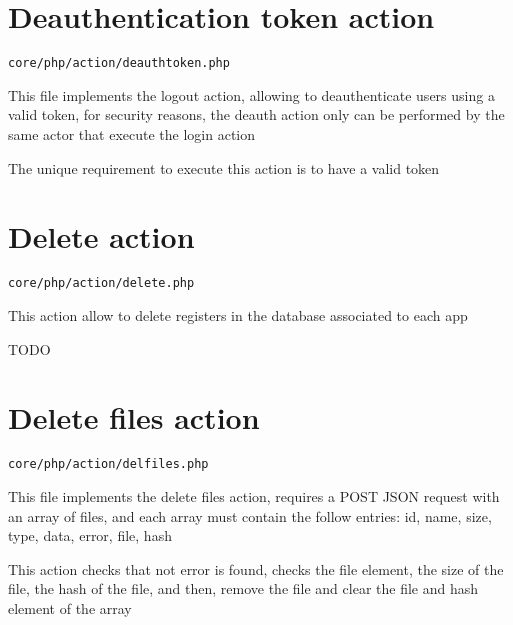 \documentclass[a4paper]{book}
\begin{document}
\hypertarget{toc10}{}
\section{Deauthentication token action}

\begin{lstlisting}
core/php/action/deauthtoken.php
\end{lstlisting}

This file implements the logout action, allowing to deauthenticate users
using a valid token, for security reasons, the deauth action only can
be performed by the same actor that execute the login action

The unique requirement to execute this action is to have a valid token

\hypertarget{toc11}{}
\section{Delete action}

\begin{lstlisting}
core/php/action/delete.php
\end{lstlisting}

This action allow to delete registers in the database associated to
each app

TODO

\hypertarget{toc12}{}
\section{Delete files action}

\begin{lstlisting}
core/php/action/delfiles.php
\end{lstlisting}

This file implements the delete files action, requires a POST JSON request
with an array of files, and each array must contain the follow entries:
id, name, size, type, data, error, file, hash

This action checks that not error is found, checks the file element, the
size of the file, the hash of the file, and then, remove the file and
clear the file and hash element of the array
\end{document}
